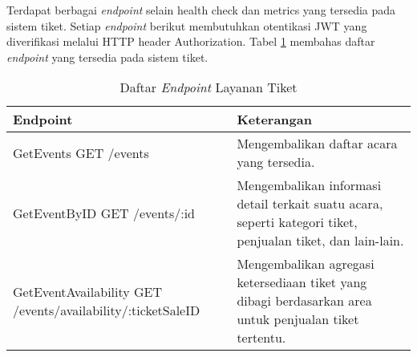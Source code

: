 Terdapat berbagai \textit{endpoint} selain health check dan metrics yang tersedia pada sistem tiket. Setiap \textit{endpoint} berikut membutuhkan otentikasi JWT yang diverifikasi melalui HTTP header Authorization. Tabel \ref{table:ticket-endpoint} membahas daftar \textit{endpoint} yang tersedia pada sistem tiket.

\begin{table}[h!]
    \centering
    \caption{Daftar \textit{Endpoint} Layanan Tiket}
    \label{table:ticket-endpoint}
    \begin{tabular}{|p{}|p{}|}
        \hline
        \textbf{Endpoint}                                                    & \textbf{Keterangan}                                                                                                                                                                                                                                                                                                                                                                            \\
        \hline
        GetEvents \newline GET /events                                       & Mengembalikan daftar acara yang tersedia.                                                                                                                                                                                                                                                                                                                                                      \\
        \hline
        GetEventByID \newline GET /events/:id                                & Mengembalikan informasi detail terkait suatu acara, seperti kategori tiket, penjualan tiket, dan lain-lain.                                                                                                                                                                                                                                                                                    \\
        \hline
        GetEventAvailability \newline GET /events/availability/:ticketSaleID & Mengembalikan agregasi ketersediaan tiket yang dibagi berdasarkan area untuk penjualan tiket tertentu.                                                                                                                                                                                                                                                                                         \\

\end{tabular}
\end{table}
